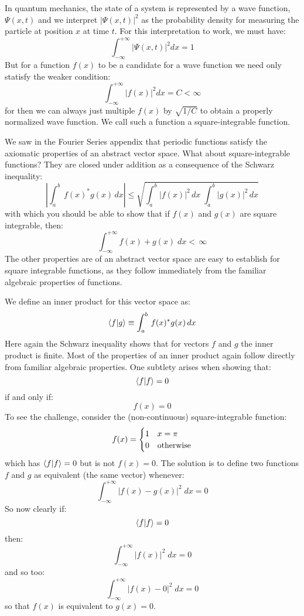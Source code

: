 \documentclass[12pt]{book}
\begin{document}
In quantum mechanics, the state of a system is represented by a wave function, $\Psi(x,t)$ and we interpret $|\Psi(x,t)|^2$ as the probability density for measuring the particle at position $x$ at time $t$.  For this interpretation to work, we must have:
$$\int_{-\infty}^{+\infty} |\Psi(x,t)|^2 dx = 1$$
But for a function $f(x)$ to be a candidate for a wave function we need only statisfy the weaker condition:
$$\int_{-\infty}^{+\infty} |f(x)|^2 dx = C < \infty$$
for then we can always just multiple $f(x)$ by $\sqrt{1/C}$ to obtain a properly normalized wave function.  We call such a function a square-integrable function.

We saw in the Fourier Series appendix that periodic functions satisfy the axiomatic properties of an abstract vector space.  What about square-integrable functions?  They are closed under addition as a consequence of the Schwarz inequality:
\begin{equation}
\left|\int_a^b \, f(x)^* g(x) \, dx\right| \leq \sqrt{\int_a^b |f(x)|^2 \, dx \; \int_a^b |g(x)|^2 \, dx}
\end{equation}
with which you should be able to show that if $f(x)$ and $g(x)$ are square integrable, then:
$$\int_{-\infty}^{+\infty} f(x) + g(x) \; dx < \, \infty$$
The other properties are of an abstract vector space are easy to establish for square integrable functions, as they follow immediately from the familiar algebraic properties of functions. 

We define an inner product for this vector space as:
$$\braket{f|g} \equiv \int_a^b \, f(x)^* g(x) \, dx$$
Here again the Schwarz inequality shows that for vectors $f$ and $g$ the inner product is finite.  Most of the properties of an inner product again follow directly from familiar algebraic properties.  One subtlety arises when showing that:
$$\braket{f|f}=0$$
if and only if:
$$f(x)=0$$
To see the challenge, consider the (non-continuous) square-integrable function:
$$f(x)=
\begin{cases}
1 & x=\pi \\
0 & {\rm otherwise} \\
\end{cases}
$$
which has $\braket{f|f}=0$ but is not $f(x)=0$.  The solution is to define two functions $f$ and $g$ as equivalent (the same vector) whenever:
$$\int_{-\infty}^{+\infty} |f(x) - g(x)|^2 \; dx = 0 $$
So now clearly if:
$$\braket{f|f} = 0$$
then:
$$\int_{-\infty}^{+\infty} |f(x)|^2 \; dx = 0 $$
and so too:
$$\int_{-\infty}^{+\infty} |f(x) - 0|^2 \; dx = 0 $$
so that $f(x)$ is equivalent to $g(x)=0$.
\end{document}
